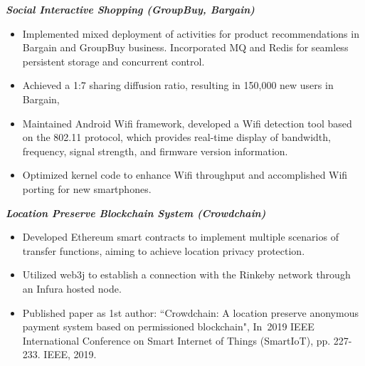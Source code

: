 \documentclass{resume}
\begin{document}
\textit{\textbf{Social Interactive Shopping (GroupBuy, Bargain)}}
\begin{itemize}
  \item Implemented mixed deployment of activities for product recommendations in Bargain and GroupBuy business. Incorporated MQ and Redis for seamless persistent storage and concurrent control.
  \item Achieved a 1:7 sharing diffusion ratio, resulting in 150,000 new users in Bargain,
\end{itemize}

\begin{itemize}
  \item Maintained Android Wifi framework, developed a Wifi detection tool based on the 802.11 protocol, which provides real-time display of bandwidth, frequency, signal strength, and firmware version information.
  \item Optimized kernel code to enhance Wifi throughput and accomplished Wifi porting for new smartphones.
\end{itemize}


\textit{\textbf{\hspace{1em}Location Preserve Blockchain System (Crowdchain)}}
\setlength{\parindent}{0em}

\begin{itemize}
  \item Developed Ethereum smart contracts to implement multiple scenarios of transfer functions, aiming to achieve location privacy protection. 
  \item Utilized web3j to establish a connection with the Rinkeby network through an Infura hosted node.
  \item Published paper as 1st author: ``Crowdchain: A location preserve anonymous payment system based on permissioned blockchain", In 2019 IEEE International Conference on Smart Internet of Things (SmartIoT), pp. 227-233. IEEE, 2019.
\end{itemize}
\end{document}

